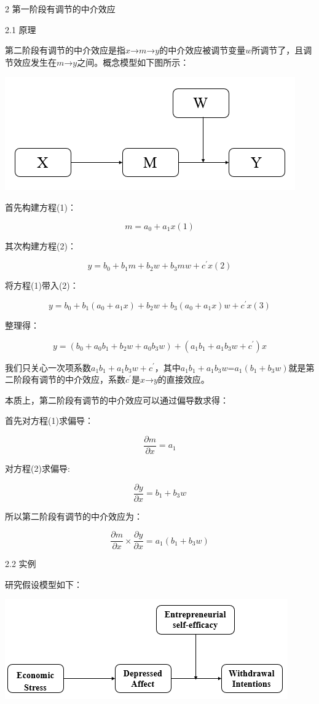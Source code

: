 \documentclass[
]{book}
\begin{document}
2 第一阶段有调节的中介效应

2.1 原理

第二阶段有调节的中介效应是指\(x\)→\(m\)→\(y\)的中介效应被调节变量\(w\)所调节了，且调节效应发生在\(m\)→\(y\)之间。概念模型如下图所示：

\includegraphics{figs/1145.png}

首先构建方程(1)：

\[
m=a_{0}+a_{1}x(1)
\]

其次构建方程(2)：

\[
y=b_{0}+b_{1}m+b_{2}w+b_{3}mw+c^{'}x(2)
\]

将方程(1)带入(2)：

\[
y=b_{0}+b_{1}(a_{0}+a_{1}x)+b_{2}w+b_{3}(a_{0}+a_{1}x)w+c^{'}x(3)
\]

整理得：

\[
y=(b_{0}+a_{0}b_{1}+b_{2}w+a_{0}b_{3}w)+(a_{1}b_{1}+a_{1}b_{3}w+c^{'})x
\]

我们只关心一次项系数\(a_{1}b_{1}+a_{1}b_{3}w+c^{'}\)，其中\(a_{1}b_{1}+a_{1}b_{3}w\)=\(a_{1}(b_{1}+b_{3}w)\)就是第二阶段有调节的中介效应，系数\(c^{'}\)是\(x\)→\(y\)的直接效应。

本质上，第二阶段有调节的中介效应可以通过偏导数求得：

首先对方程(1)求偏导：

\[
\frac{\partial m}{\partial x}=a_{1}
\]

对方程(2)求偏导:

\[
\frac{\partial y}{\partial x}=b_{1}+b_{3}w
\]

所以第二阶段有调节的中介效应为：

\[
\frac{\partial m}{\partial x} {\times} \frac{\partial y}{\partial x}=a_{1}(b_{1}+b_{3}w)
\]

2.2 实例

研究假设模型如下：

\includegraphics{figs/1146.png}
\end{document}
